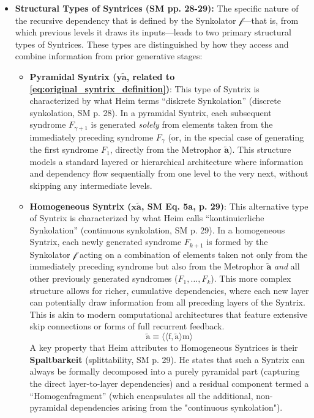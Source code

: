 \documentclass[12pt]{article}
\newcommand{\q}[1]{\enquote{#1}}
\newcommand{\syntrix}{\bm{y\widetilde{a}}}
\newcommand{\homogeneoussyntrix}{\bm{x\widetilde{a}}}
\newcommand{\metrophor}{\bm{\widetilde{a}}}
\newcommand{\synkolator}{\mathcal{f}}
\newcommand{\syndrom}{F}
\begin{document}
\begin{itemize}
    \item \textbf{Structural Types of Syntrices (SM pp. 28-29):}
    The specific nature of the recursive dependency that is defined by the Synkolator \( \synkolator \)—that is, from which previous levels it draws its inputs—leads to two primary structural types of Syntrices. These types are distinguished by how they access and combine information from prior generative stages:
    \begin{itemize}
        \item \textbf{Pyramidal Syntrix (\( \syntrix \), related to \eqref{eq:original_syntrix_definition})}: This type of Syntrix is characterized by what Heim terms \q{diskrete Synkolation} (discrete synkolation, SM p. 28). In a pyramidal Syntrix, each subsequent syndrome \( \syndrom_{\gamma+1} \) is generated \textit{solely} from elements taken from the immediately preceding syndrome \( \syndrom_\gamma \) (or, in the special case of generating the first syndrome \( \syndrom_1 \), directly from the Metrophor \( \metrophor \)). This structure models a standard layered or hierarchical architecture where information and dependency flow sequentially from one level to the very next, without skipping any intermediate levels.
        \item \textbf{Homogeneous Syntrix (\( \homogeneoussyntrix \), SM Eq. 5a, p. 29)}: This alternative type of Syntrix is characterized by what Heim calls \q{kontinuierliche Synkolation} (continuous synkolation, SM p. 29). In a homogeneous Syntrix, each newly generated syndrome \( \syndrom_{k+1} \) is formed by the Synkolator \( \synkolator \) acting on a combination of elements taken not only from the immediately preceding syndrome but also from the Metrophor \( \metrophor \) \textit{and} all other previously generated syndromes (\( \syndrom_1, \dots, \syndrom_k \)). This more complex structure allows for richer, cumulative dependencies, where each new layer can potentially draw information from all preceding layers of the Syntrix. This is akin to modern computational architectures that feature extensive skip connections or forms of full recurrent feedback.
        \begin{equation}
        \tilde{\mathrm{a}} \equiv \langle\langle \mathrm{f}, \tilde{\mathrm{a}} \rangle \mathrm{m} \rangle \tag{5a}
        \label{eq:original_homogeneous_syntrix}
        \end{equation}
        A key property that Heim attributes to Homogeneous Syntrices is their \textbf{Spaltbarkeit} (splittability, SM p. 29). He states that such a Syntrix can always be formally decomposed into a purely pyramidal part (capturing the direct layer-to-layer dependencies) and a residual component termed a \q{Homogenfragment} (which encapsulates all the additional, non-pyramidal dependencies arising from the "continuous synkolation").
    \end{itemize}


\end{itemize}
\end{document}
